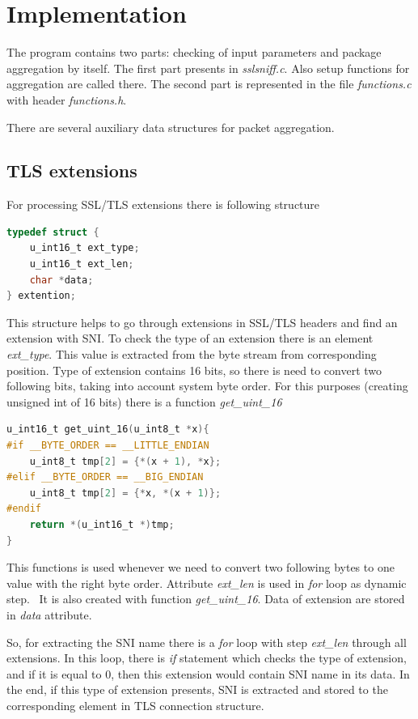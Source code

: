 \documentclass[12pt,a4paper]{article}
\begin{document}
    
    \section{Implementation}
    The program contains two parts: checking of input parameters and package 
    aggregation by itself. The first part presents in \textit{sslsniff.c}. Also 
    setup functions for aggregation are called there. The second part is represented 
    in the file \textit{functions.c} with header \textit{functions.h}. 

    There are several auxiliary data structures for packet aggregation. 

    \subsection{TLS extensions}
    For processing SSL/TLS extensions there is following structure
    \lstset{style=mystyle}
    \begin{lstlisting}[language=C]
typedef struct {
    u_int16_t ext_type;
    u_int16_t ext_len;
    char *data;
} extention;
\end{lstlisting}
     
    This structure helps to go through extensions in SSL/TLS headers and find an 
    extension with SNI. 
    To check the type of an extension there is an element \textit{ext\_type}. 
    This value is extracted from the byte stream from corresponding position. 
    Type of extension contains 16 bits, so there is need to convert two following 
    bits, taking into account system byte order. For this purposes (creating 
    unsigned int of 16 bits) there is a function \textit{get\_uint\_16}
    \begin{lstlisting}[language=C]
u_int16_t get_uint_16(u_int8_t *x){
#if __BYTE_ORDER == __LITTLE_ENDIAN
    u_int8_t tmp[2] = {*(x + 1), *x};
#elif __BYTE_ORDER == __BIG_ENDIAN
    u_int8_t tmp[2] = {*x, *(x + 1)};
#endif
    return *(u_int16_t *)tmp;
}
\end{lstlisting}

    This functions is used whenever we need to convert two following bytes to 
    one value with the right byte order.
    Attribute \textit{ext\_len} is used in \textit{for} loop as dynamic step. \
    It is also created with function \textit{get\_uint\_16}. Data of extension
    are stored in \textit{data} attribute.

    So, for extracting the SNI name there is a \textit{for} loop with step 
    \textit{ext\_len} through all extensions. In this
    loop, there is \textit{if} statement which checks the type of extension, and if it
    is equal to 0, then this extension would contain SNI name in its data. In the
    end, if this type of extension presents, SNI is extracted and stored to the
    corresponding element in TLS connection structure.
    
\end{document}

